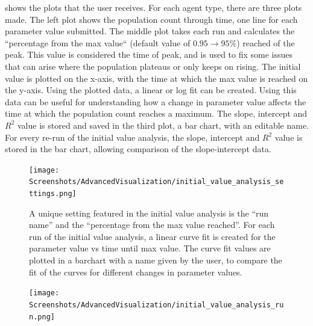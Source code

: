  shows the plots that the user receives. 
For each agent type, there are three plots made. 
The left plot shows the population count through time, one line for each parameter value submitted. 
The middle plot takes each run and calculates the “percentage from the max value“ (default value of $0.95 \rightarrow 95\%$) reached of the peak. 
This value is considered the time of peak, and is used to fix some issues that can arise where the population plateaus or only keeps on rising. 
The initial value is plotted on the x-axis, with the time at which the max value is reached on the y-axis. 
Using the plotted data, a linear or log fit can be created. 
Using this data can be useful for understanding how a change in parameter value affects the time at which the population count reaches a maximum. 
The slope, intercept and $R^2$ value is stored and saved in the third plot, a bar chart, with an editable name. 
For every re-run of the initial value analysis, the slope, intercept and $R^2$ value is stored in the bar chart, allowing comparison of the slope-intercept data. 
\begin{figure}
    \centering
    \texttt{[image: Screenshots/AdvancedVisualization/initial\_value\_analysis\_settings.png]}
    \caption{
        A unique setting featured in the initial value analysis is the “run name” and the “percentage from the max value reached”. 
        For each run of the initial value analysis, a linear curve fit is created for the parameter value vs time until max value. 
        The curve fit values are plotted in a barchart with a name given by the user, to compare the fit of the curves for different changes in parameter values. 
    }
    \label{fig:ss:av:initial_value_analysis_settings}
\end{figure}
\begin{figure}
    \centering
    \texttt{[image: Screenshots/AdvancedVisualization/initial\_value\_analysis\_run.png]}
    \caption{
    }
    \label{fig:ss:av:initial_value_analysis_run}
\end{figure}


